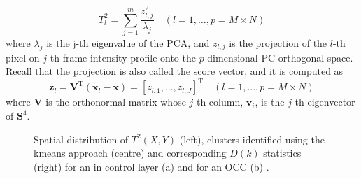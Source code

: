 \begin{equation}
T_l^2=\sum_{j=1}^m \frac{z_{l, j}^2}{\lambda_j} \quad(l=1, \ldots, p=M \times N)
\end{equation}
where $\lambda_j$ is the j-th eigenvalue of the PCA, and $z_{l, j}$ is the  projection of the $l$-th pixel on $j$-th frame intensity profile onto the $p$-dimensional PC orthogonal space. Recall that the projection is also called the score vector, and it is computed as
\begin{equation}
\mathbf{z}_l=\mathbf{V}^{\mathrm{T}}\left(\mathbf{x}_l-\overline{\mathbf{x}}\right)=\left[z_{l, 1}, \ldots, z_{l, J}\right]^{\mathrm{T}} \quad(l=1, \ldots, p=M \times N)
\end{equation}
where $\mathbf{V}$ is the orthonormal matrix whose $j$ th column, $\boldsymbol{v}_i$, is the $j$ th eigenvector of $\mathbf{S}^4$.
\begin{figure}
    \centering
    \qquad
    \caption[T-PCA approach for HS detection.]{Spatial distribution of $T^2(X,Y)$ (left), clusters identified using the kmeans approach (centre) and corresponding $D(k)$ statistics (right) for an in control layer (a) and for an OCC (b) \cite{grasso_-process_2017}.}
\end{figure}
